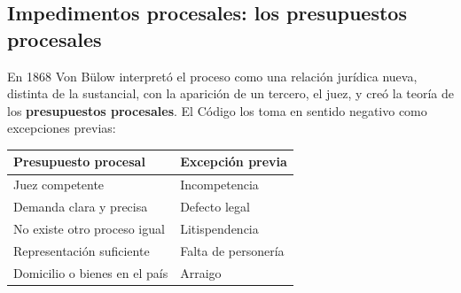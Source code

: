 \documentclass[12pt,oneside]{book}
\renewcommand{\arraystretch}{1.15}
\begin{document}
\subsection{Impedimentos procesales: los presupuestos procesales}

En 1868 Von Bülow interpretó el proceso como una relación jurídica nueva, distinta de la sustancial, con la aparición de un tercero, el juez, y creó la teoría de los \textbf{presupuestos procesales}. El Código los toma en sentido negativo como excepciones previas:

\begin{table}[H]
\centering
\renewcommand{\arraystretch}{1.2}
\begin{tabularx}{\textwidth}{>{\RaggedRight\arraybackslash}X>{\RaggedRight\arraybackslash}X}
\toprule
\textbf{Presupuesto procesal} & \textbf{Excepción previa} \\
\midrule
Juez competente & Incompetencia \\
Demanda clara y precisa & Defecto legal \\
No existe otro proceso igual & Litispendencia \\
Representación suficiente & Falta de personería \\
Domicilio o bienes en el país & Arraigo \\
\bottomrule
\end{tabularx}
\end{table}
\end{document}
